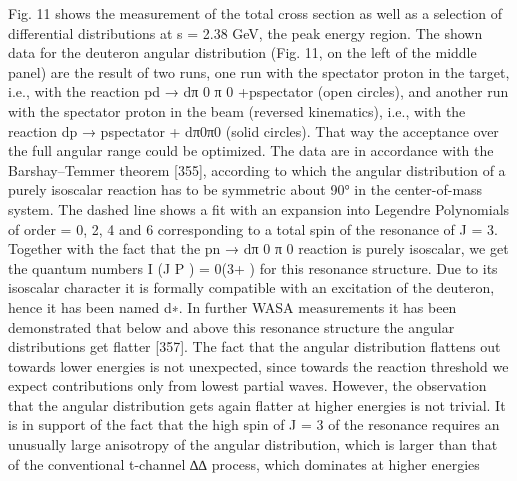 Fig. 11 shows the measurement of the total cross section as well as a selection of differential distributions at s = 2.38 GeV, the peak energy region. The shown data for the deuteron angular distribution (Fig. 11, on the left of the middle
panel) are the result of two runs, one run with the spectator proton in the target, i.e., with the reaction pd → dπ 0 π 0 +pspectator (open circles), and another run with the spectator proton in the beam (reversed kinematics), i.e., with the reaction dp → pspectator + dπ0π0 (solid circles). That way the acceptance over the full angular range could be optimized. The data are in accordance with the Barshay–Temmer theorem [355], according to which the angular distribution of a purely isoscalar reaction has to be symmetric about 90° in the center-of-mass system. The dashed line shows a fit with an expansion into Legendre Polynomials of order = 0, 2, 4 and 6 corresponding to a total spin of the resonance of J = 3. Together with the fact that the pn → dπ 0 π 0 reaction is purely isoscalar, we get the quantum numbers I (J P ) = 0(3+ ) for this resonance structure. Due to its isoscalar character it is formally compatible with an excitation of the deuteron, hence it has been named d∗.
In further WASA measurements it has been demonstrated that below and above this resonance structure the angular distributions get flatter [357]. The fact that the angular distribution flattens out towards lower energies is not unexpected, since towards the reaction threshold we expect contributions only from lowest partial waves. However, the observation that the angular distribution gets again flatter at higher energies is not trivial. It is in support of the fact that the high spin of J = 3 of the resonance requires an unusually large anisotropy of the angular distribution, which is larger than that of the conventional t-channel ∆∆ process, which dominates at higher energies



